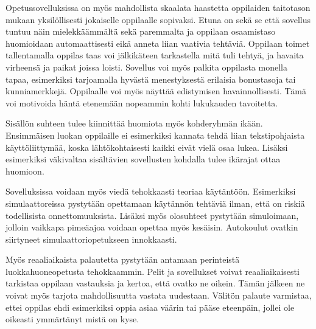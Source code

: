 \documentclass[utf8,bachelor]{gradu3}
\begin{document}
Opetussovelluksissa on myös mahdollista skaalata haastetta oppilaiden taitotason mukaan yksilöllisesti jokaiselle oppilaalle sopivaksi. Etuna on sekä se että sovellus tuntuu näin mielekkäämmältä sekä paremmalta ja oppilaan osaamistaso huomioidaan automaattisesti eikä anneta liian vaativia tehtäviä. \parencite[][]{koulunArki} \parencite[][13-14]{gamePaper} Oppilaan toimet tallentamalla oppilas taas voi jälkikäteen tarkastella mitä tuli tehtyä, ja havaita virheensä ja paikat joissa loisti. Sovellus voi myös palkita oppilasta monella tapaa, esimerkiksi tarjoamalla hyvästä menestyksestä erilaisia bonustasoja tai kunniamerkkejä. Oppilaalle voi myös näyttää edistymisen havainnollisesti. Tämä voi motivoida häntä etenemään nopeammin kohti lukukauden tavoitetta.

Sisällön suhteen tulee kiinnittää huomiota myös kohderyhmän ikään. Ensimmäisen luokan oppilaille ei esimerkiksi kannata tehdä liian tekstipohjaista käyttöliittymää, koska lähtökohtaisesti kaikki eivät vielä osaa lukea. Lisäksi esimerkiksi väkivaltaa sisältävien sovellusten kohdalla tulee ikärajat ottaa huomioon.


Sovelluksissa voidaan myös viedä tehokkaasti teoriaa käytäntöön. Esimerkiksi simulaattoreissa pystytään opettamaan käytännön tehtäviä ilman, että on riskiä todellisista onnettomuuksista. Lisäksi myös olosuhteet pystytään simuloimaan, jolloin vaikkapa pimeäajoa voidaan opettaa myös kesäisin. Autokoulut ovatkin siirtyneet simulaattoriopetukseen innokkaasti. \parencite[][]{simut}

Myös reaaliaikaista palautetta pystytään antamaan perinteistä luokkahuoneopetusta tehokkaammin. Pelit ja sovellukset voivat reaaliaikaisesti tarkistaa oppilaan vastauksia ja kertoa, että ovatko ne oikein. Tämän jälkeen ne voivat myös tarjota mahdollisuutta vastata uudestaan. Välitön palaute varmistaa, ettei oppilas ehdi esimerkiksi oppia asiaa väärin tai pääse eteenpäin, jollei ole oikeasti ymmärtänyt mistä on kyse.
\end{document}
